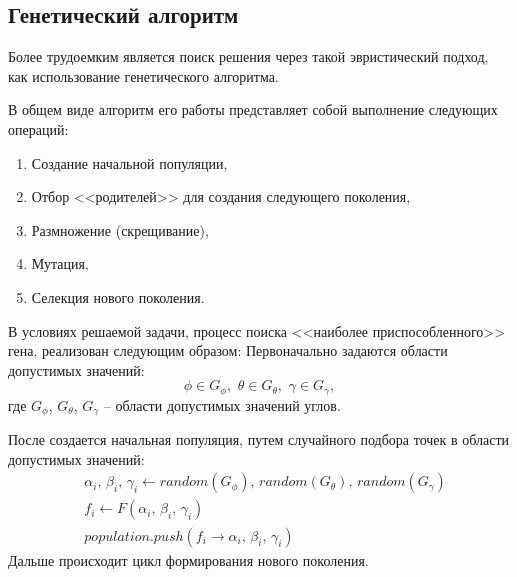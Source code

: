 \subsection{Генетический алгоритм}
\noindent\indent Более трудоемким является поиск решения через такой эвристический
подход, как использование генетического алгоритма.\par
  В общем виде алгоритм его работы представляет собой выполнение следующих операций:
\begin{enumerate}
  \item Создание начальной популяции,
  \item Отбор <<родителей>> для создания следующего поколения,
  \item Размножение (скрещивание),
  \item Мутация,
  \item Селекция нового поколения.
\end{enumerate}\par
  В условиях решаемой задачи, процесс поиска <<наиболее приспособленного>> гена,
реализован следующим образом:
  Первоначально задаются области допустимых значений:
\begin{equation}
    \phi \in G_{\phi},\,\, \theta \in G_{\theta},\,\, \gamma \in G_{\gamma},
\end{equation}
где $G_{\phi}$, $G_{\theta}$, $G_{\gamma}$ -- области допустимых значений углов.\par
    После создается начальная популяция, путем случайного подбора точек в области допустимых
значений:
\begin{equation}
  \begin{aligned}
    & \alpha_i,\, \beta_i,\, \gamma_i \leftarrow random(G_\phi),\, random(G_\theta),\, random(G_\gamma) \\
    & f_i \leftarrow F(\alpha_i,\, \beta_i,\, \gamma_i) \\
    & population.push(f_i \rightarrow \alpha_i,\, \beta_i,\, \gamma_i)
  \end{aligned}
\end{equation}
  Дальше происходит цикл формирования нового поколения.
